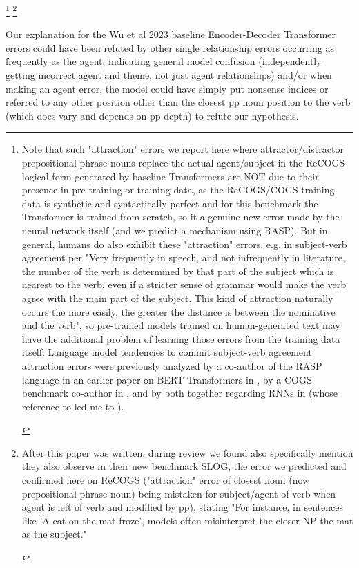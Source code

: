 \documentclass[11pt]{article}
\begin{document}
\footnote{
\begin{tiny}
Note that such "attraction" errors we report here where attractor/distractor prepositional phrase nouns replace the actual agent/subject in the ReCOGS logical form generated by \cite{Wu2023} baseline Transformers are NOT due to their presence in pre-training or training data, as the ReCOGS/COGS training data is synthetic and syntactically perfect and for this benchmark the Transformer is trained from scratch, so it a genuine new error made by the neural network itself (and we predict a mechanism using RASP). But in general, humans do also exhibit these "attraction" errors, e.g. in subject-verb agreement per \cite{jespersen1913modernenglishgrammar1954reprint} "Very frequently in speech, and not infrequently in literature, the number of the verb is determined by that part of the subject which is nearest to the verb, even if a stricter sense of grammar would make the verb agree with the main part of the subject. This kind of attraction naturally occurs the more easily, the greater the distance is between the nominative and the verb", so pre-trained models trained on human-generated text may have the additional problem of learning those errors from the training data itself. Language model tendencies to commit subject-verb agreement attraction errors were previously analyzed by a co-author of the RASP language in an earlier paper on BERT Transformers in \cite{goldberg2019assessingbertssyntacticabilities}, by a COGS benchmark co-author in \cite{vanschijndel2019quantitydoesntbuyquality}, and by both together regarding RNNs in \cite{linzen2016assessing} (whose reference to \cite{agreementwithnearestlanguagelog} led me to \cite{jespersen1913modernenglishgrammar1954reprint}).
\end{tiny}
}
\footnote{
\begin{tiny}
After this paper was written, during review we found \cite{li2023slogstructuralgeneralizationbenchmark} also specifically mention they also observe in their new benchmark SLOG, the error we predicted and confirmed here on ReCOGS ("attraction" error of closest noun (now prepositional phrase noun) being mistaken for subject/agent of verb when agent is left of verb and modified by pp), stating "For instance, in sentences like 'A cat on the mat froze', models often misinterpret the closer NP the mat as the subject."
\end{tiny}
}

Our explanation for the Wu et al 2023 baseline Encoder-Decoder Transformer errors could have been refuted by other single relationship errors occurring as frequently as the agent, indicating general model confusion (independently getting incorrect agent and theme, not just agent relationships) and/or when making an agent error, the model could have simply put nonsense indices or referred to any other position other than the closest pp noun position to the verb (which does vary and depends on pp depth) to refute our hypothesis.
\end{document}
